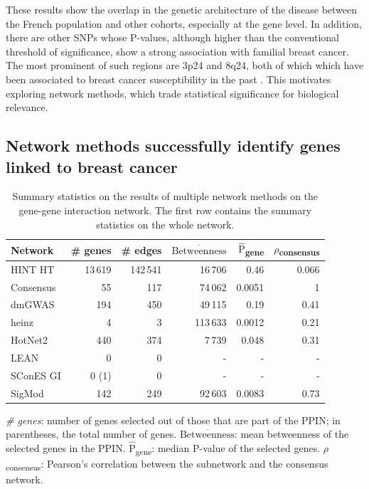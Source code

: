 \documentclass[twocolumn, 10pt]{article}
\newcommand{\mean}[1]{$\overline{\mbox{#1}}$}
\newcommand{\median}[1]{$\hat{\mbox{#1}}$}
\begin{document}
These results show the overlap in the genetic architecture of the disease between the French population and other cohorts, especially at the gene level. In addition, there are other SNPs whose P-values, although higher than the conventional threshold of significance, show a strong association with familial breast cancer. The most prominent of such regions are 3p24 and 8q24, both of which  which have been associated to breast cancer susceptibility in the past \cite{brisbin_meta-analysis_2011,search_newly_2009}. This motivates exploring network methods, which trade statistical significance for biological relevance.

\subsection{Network methods successfully identify genes linked to breast cancer}
\label{results:separate_networks}
\begin{table}[htbp]
  \begin{threeparttable}
\caption{\label{tab:gene_solutions}
Summary statistics on the results of multiple network methods on the gene-gene interaction network. The first row contains the summary statistics on the whole network.}
\centering
\begin{tabular}{lrrrrr}
Network & \# genes & \# edges & \mean{Betweenness} & \median{P}\textsubscript{gene} & \(\rho\)\textsubscript{consensus}\\
\hline
HINT HT & 13\,619 & 142\,541 & 16\,706 & 0.46 & 0.066\\
\hline
Consensus & 55 & 117 & 74\,062 & 0.0051 & 1\\
dmGWAS & 194 & 450 & 49\,115 & 0.19 & 0.41\\
heinz & 4 & 3 & 113\,633 & 0.0012 & 0.21\\
HotNet2 & 440 & 374 & 7\,739 & 0.048 & 0.31\\
LEAN & 0 & 0 & - & - & -\\
SConES GI & 0 (1) & 0 & - & - & -\\
SigMod & 142 & 249 & 92\,603 & 0.0083 & 0.73\\
\end{tabular}
\begin{tablenotes}
\emph{\# genes}: number of genes selected out of those that are part of the PPIN; in parentheses, the total number of genes. \mean{Betweenness}: mean betweenness of the selected genes in the PPIN. \median{P}\textsubscript{gene}: median P-value of the selected genes. \(\rho\)\textsubscript{consensus}: Pearson's correlation between the subnetwork and the consensus network.
\end{tablenotes}
\end{threeparttable}
\end{table}
\end{document}
